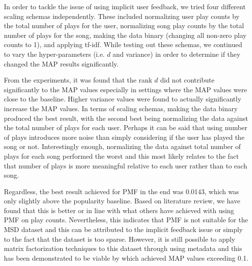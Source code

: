 \documentclass[12pt,preprint]{aastex}
\begin{document}
In order to tackle the issue of using implicit user feedback, we tried four different scaling schemas independently. These included normalizing user play counts by the total number of plays for the user, normalizing song play counts by the total number of plays for the song, making the data binary (changing all non-zero play counts to 1), and  applying tf-idf. While testing out these schemas, we continued to vary the hyper-parameters (i.e. $d$ and variance) in order to determine if they changed the MAP results significantly. 
 
From the experiments, it was found that the rank $d$ did not contribute significantly to the MAP values especially in settings where the MAP values were close to the baseline. Higher variance values were found to actually significantly increase the MAP values. In terms of scaling schemas, making the data binary produced the best result, with the second best being normalizing the data against the total number of plays for each user. Perhaps it can be said that using number of plays introduces more noise than simply considering if the user has played the song or not. Interestingly enough, normalizing the data against total number of plays for each song performed the worst and this most likely relates to the fact that number of plays is more meaningful relative to each user rather than to each song.
 
Regardless, the best result achieved for PMF in the end was 0.0143, which was only slightly above the popularity baseline. Based on literature review, we have found that this is better or in line with what others have achieved with using PMF on play counts. Nevertheless, this indicates that PMF is not suitable for the MSD dataset and this can be attributed to the implicit feedback issue or simply to the fact that the dataset is too sparse. However, it is still possible to apply matrix factorization techniques to this dataset through using metadata and this has been demonstrated to be viable by \citet{liangcodebook} which achieved MAP values exceeding 0.1.  

\citep{hu2008collaborative}



%
\end{document}
